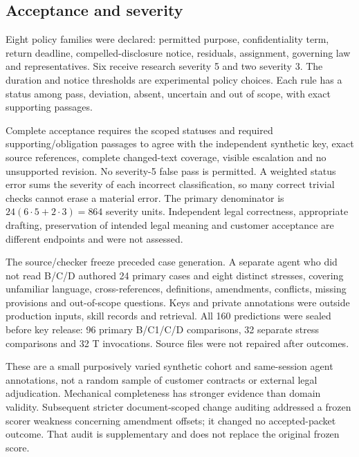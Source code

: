 \documentclass[10pt,a4paper]{article}
\begin{document}
\subsection{Acceptance and severity}
Eight policy families were declared: permitted purpose, confidentiality term, return deadline, compelled-disclosure notice, residuals, assignment, governing law and representatives. Six receive research severity 5 and two severity 3. The duration and notice thresholds are experimental policy choices. Each rule has a status among pass, deviation, absent, uncertain and out of scope, with exact supporting passages.

Complete acceptance requires the scoped statuses and required supporting/obligation passages to agree with the independent synthetic key, exact source references, complete changed-text coverage, visible escalation and no unsupported revision. No severity-5 false pass is permitted. A weighted status error sums the severity of each incorrect classification, so many correct trivial checks cannot erase a material error. The primary denominator is $24(6\cdot5+2\cdot3)=864$ severity units. Independent legal correctness, appropriate drafting, preservation of intended legal meaning and customer acceptance are different endpoints and were not assessed.

The source/checker freeze preceded case generation. A separate agent who did not read B/C/D authored 24 primary cases and eight distinct stresses, covering unfamiliar language, cross-references, definitions, amendments, conflicts, missing provisions and out-of-scope questions. Keys and private annotations were outside production inputs, skill records and retrieval. All 160 predictions were sealed before key release: 96 primary B/C1/C/D comparisons, 32 separate stress comparisons and 32 T invocations. Source files were not repaired after outcomes.

These are a small purposively varied synthetic cohort and same-session agent annotations, not a random sample of customer contracts or external legal adjudication. Mechanical completeness has stronger evidence than domain validity. Subsequent stricter document-scoped change auditing addressed a frozen scorer weakness concerning amendment offsets; it changed no accepted-packet outcome. That audit is supplementary and does not replace the original frozen score.
\end{document}
